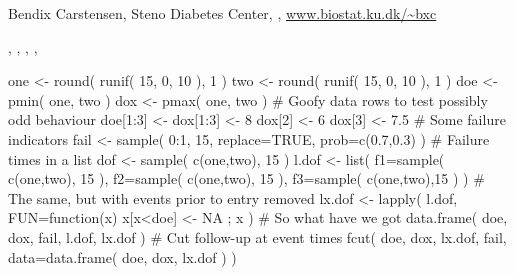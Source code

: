 \begin{Author}\relax
Bendix Carstensen, Steno Diabetes Center,
, \url{www.biostat.ku.dk/~bxc}
\end{Author}
\begin{SeeAlso}\relax
{},
,
,
,
\end{SeeAlso}
\begin{Examples}
\begin{ExampleCode}
one <- round( runif( 15, 0, 10 ), 1 )
two <- round( runif( 15, 0, 10 ), 1 )
doe <- pmin( one, two )
dox <- pmax( one, two )
# Goofy data rows to test possibly odd behaviour
doe[1:3] <- dox[1:3] <- 8
dox[2] <- 6
dox[3] <- 7.5
# Some failure indicators
fail <- sample( 0:1, 15, replace=TRUE, prob=c(0.7,0.3) )
# Failure times in a list
dof <- sample( c(one,two), 15 )
l.dof <- list( f1=sample( c(one,two), 15 ),
               f2=sample( c(one,two), 15 ),
               f3=sample( c(one,two),15 ) )
# The same, but with events prior to entry removed
lx.dof <- lapply( l.dof, FUN=function(x){ x[x<doe] <- NA ; x } )
# So what have we got
data.frame( doe, dox, fail, l.dof, lx.dof )
# Cut follow-up at event times
fcut( doe, dox, lx.dof, fail, data=data.frame( doe, dox, lx.dof ) )
\end{ExampleCode}
\end{Examples}

